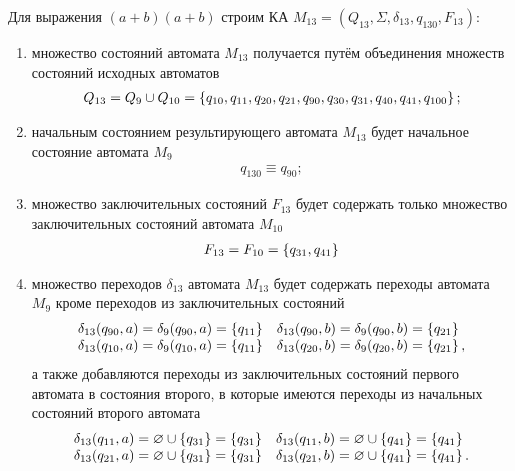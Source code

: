 \newpage
Для выражения \((a+b)(a+b)\) строим КА \(M_{13} = (Q_{13}, \Sigma, \delta_{13}, q_{130}, F_{13})\):
\begin{enumerate}
	\item множество состояний автомата \(M_{13}\) получается путём объединения множеств состояний исходных автоматов
	      \begin{align*}
		      Q_{13} = Q_{9} \cup Q_{10} = \left\{q_{10}, q_{11}, q_{20}, q_{21}, q_{90},q_{30}, q_{31}, q_{40}, q_{41}, q_{100} \right\};
	      \end{align*}
	\item начальным состоянием результирующего автомата \(M_{13}\) будет начальное состояние автомата \(M_9\)
	      \begin{align*}
		      q_{130} \equiv q_{90};
	      \end{align*}
	\item множество заключительных состояний \(F_{13}\) будет содержать только множество заключительных состояний автомата \(M_{10}\)
	      \begin{align*}
		      F_{13} = F_{10} = \left\{q_{31}, q_{41}\right\}
	      \end{align*}
	\item множество переходов \(\delta_{13}\) автомата \(M_{13}\) будет содержать переходы автомата \(M_{9}\) кроме переходов из заключительных состояний
	      \begin{align*}
		      \begin{array}{ll}
			      \delta_{13}(q_{90}, a)  = \delta_9(q_{90}, a) = \left\{q_{11}\right\} & \delta_{13}(q_{90}, b)  =  \delta_9(q_{90}, b) = \left\{q_{21}\right\} \\
			      \delta_{13}(q_{10}, a)  = \delta_9(q_{10}, a) = \left\{q_{11}\right\} & \delta_{13}(q_{20}, b)  = \delta_9(q_{20}, b) = \left\{q_{21}\right\},
		      \end{array}
	      \end{align*}
	      а также добавляются переходы из заключительных состояний первого автомата в состояния второго, в которые имеются переходы из начальных состояний второго автомата
	      \begin{align*}
		      \begin{array}{ll}
			      \delta_{13}(q_{11}, a)  = \varnothing \cup \left\{q_{31}\right\} = \left\{q_{31}\right\} & \delta_{13}(q_{11}, b)  = \varnothing \cup \left\{q_{41}\right\} = \left\{q_{41}\right\}  \\
			      \delta_{13}(q_{21}, a)  = \varnothing \cup \left\{q_{31}\right\} = \left\{q_{31}\right\} & \delta_{13}(q_{21}, b)  = \varnothing \cup \left\{q_{41}\right\} = \left\{q_{41}\right\}.

\end{array}
\end{align*}
\end{enumerate}
